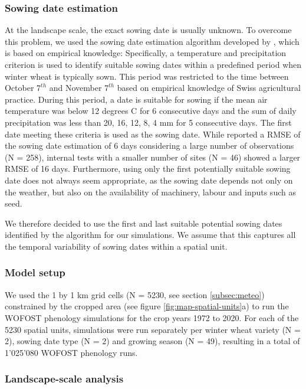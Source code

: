 \subsubsection{Sowing date estimation}
\label{subsubsec:sowing-date-estimation}
At the landscape scale, the exact sowing date is usually unknown. To overcome this problem, we used the sowing date estimation algorithm developed by \cite{holzkamper_spatial_2015}, which is based on empirical knowledge: Specifically, a temperature and precipitation criterion is used to identify suitable sowing dates within a predefined period when winter wheat is typically sown. This period was restricted to the time between October $7^{th}$ and November $7^{th}$ based on empirical knowledge of Swiss agricultural practice. During this period, a date is suitable for sowing if the mean air temperature was below 12 degrees C for 6 consecutive days and the sum of daily precipitation was less than 20, 16, 12, 8, 4 mm for 5 consecutive days. The first date meeting these criteria is used as the sowing date. While \cite{holzkamper_spatial_2015} reported a \gls{RMSE} of the sowing date estimation of 6 days considering a large number of observations (N = 258), internal tests with a smaller number of sites (N = 46) showed a larger \gls{RMSE} of 16 days. Furthermore, using only the first potentially suitable sowing date does not always seem appropriate, as the sowing date depends not only on the weather, but also on the availability of machinery, labour and inputs such as seed.

We therefore decided to use the first and last suitable potential sowing dates identified by the algorithm for our simulations. We assume that this captures all the temporal variability of sowing dates within a spatial unit.

\subsubsection{Model setup}
We used the 1 by 1 km grid cells (N = 5230, see section \ref{subsec:meteo}) constrained by the cropped area (see figure \ref{fig:map-spatial-units}a) to run the WOFOST phenology simulations for the crop years 1972 to 2020. For each of the 5230 spatial units, simulations were run separately per winter wheat variety (N = 2), sowing date type (N = 2) and growing season (N = 49), resulting in a total of 1'025'080 WOFOST phenology runs.

\subsubsection{Landscape-scale analysis}

